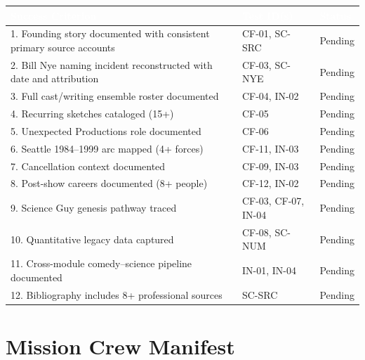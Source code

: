 \documentclass[11pt,letterpaper]{article}
\newcommand{\tableheader}[1]{\textbf{\sffamily\textcolor{white}{#1}}}
\begin{document}
\begin{center}
\begin{tabularx}{\textwidth}{XL{3.5cm}C{1.5cm}}
\toprule
{}
\tableheader{Success Criterion} & \tableheader{Test ID(s)} & \tableheader{Status} \\
. Founding story documented with consistent primary source accounts & CF-01, SC-SRC & Pending \\
2. Bill Nye naming incident reconstructed with date and attribution & CF-03, SC-NYE & Pending \\
3. Full cast/writing ensemble roster documented & CF-04, IN-02 & Pending \\
4. Recurring sketches cataloged (15+) & CF-05 & Pending \\
5. Unexpected Productions role documented & CF-06 & Pending \\
6. Seattle 1984--1999 arc mapped (4+ forces) & CF-11, IN-03 & Pending \\
7. Cancellation context documented & CF-09, IN-03 & Pending \\
8. Post-show careers documented (8+ people) & CF-12, IN-02 & Pending \\
9. Science Guy genesis pathway traced & CF-03, CF-07, IN-04 & Pending \\
10. Quantitative legacy data captured & CF-08, SC-NUM & Pending \\
11. Cross-module comedy--science pipeline documented & IN-01, IN-04 & Pending \\
12. Bibliography includes 8+ professional sources & SC-SRC & Pending \\
\bottomrule
\end{tabularx}
\end{center}

\section{Mission Crew Manifest}
\end{document}
